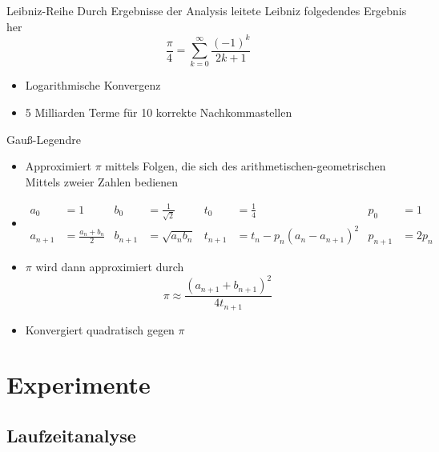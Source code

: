 \documentclass[9pt, t]{beamer}
\begin{document}
\begin{frame}{Leibniz-Reihe}
    Durch Ergebnisse der Analysis leitete Leibniz folgedendes Ergebnis her \cite{Leibniz}
    \[ \frac{\pi}{4} = \sum_{k=0}^{\infty} \frac{(-1)^k}{2k+1} \]
    \begin{itemize}
        \item<3-> Logarithmische Konvergenz \\
        \item<3-> 5 Milliarden Terme für 10 korrekte Nachkommastellen \cite{Leibniz-Approximation}
    \end{itemize}
\end{frame}

\begin{frame}{Gauß-Legendre}                                                                                                        %
    \begin{itemize}
        \item<1-> Approximiert \(\pi\) mittels Folgen, die sich des arithmetischen-geometrischen Mittels zweier Zahlen bedienen
        \item<2->
              \begin{align*}
                  a_0     & = 1                   & b_0     & = \frac{1}{\sqrt{2}} & t_0     & = \frac{1}{4}               & p_0     & = 1    \\
                  a_{n+1} & = \frac{a_n + b_n}{2} & b_{n+1} & = \sqrt{a_n b_n}     & t_{n+1} & =t_n - p_n(a_n - a_{n+1})^2 & p_{n+1} & = 2p_n
              \end{align*}
        \item<3-> \(\pi\) wird dann approximiert durch \[ \pi \approx \frac{(a_{n+1} + b_{n+1})^2}{4t_{n+1}} \]
        \item<4-> Konvergiert quadratisch gegen \(\pi\) \cite{Gauß-Legendre}
    \end{itemize}
\end{frame}

\section{Experimente}

\subsection{Laufzeitanalyse}
\end{document}
